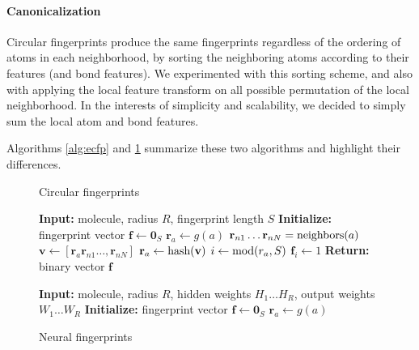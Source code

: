 \documentclass{article}
\newcommand{\vv}{\mathbf{v}}
\newcommand{\vf}{\mathbf{f}}
\newcommand{\vr}{\mathbf{r}}
\newcommand{\vzero}{\mathbf{0}}
\begin{document}
\paragraph{Canonicalization}
Circular fingerprints produce the same fingerprints regardless of the ordering of atoms in each neighborhood, by sorting the neighboring atoms according to their features (and bond features).
We experimented with this sorting scheme, and also with applying the local feature transform on all possible permutation of the local neighborhood.
In the interests of simplicity and scalability, we decided to simply sum the local atom and bond features.

Algorithms \ref{alg:ecfp} and \ref{alg:neural} summarize these two algorithms and highlight their differences.

\begin{figure}[t]
 \begin{minipage}[t]{0.49\columnwidth}
 \begin{algorithm}[H]
\caption{Circular fingerprints} 
\label{alg:ecfp} 
\begin{algorithmic}[1]
\State \textbf{Input:} {molecule, radius $R$, fingerprint length $S$}
\State \textbf{Initialize:} {fingerprint vector $\vf \leftarrow \vzero_S$}
    \State $\vr_a \leftarrow g(a)$ 
\EndFor
{} 
		\State $\vr_{n1} \dots \vr_{nN} = \textnormal{neighbors}(a)$
		\State $\vv \leftarrow [\vr_a \vr_{n1} \dots, \vr_{nN}]$ 
		\State $\vr_a \leftarrow \textnormal{hash}(\vv)$ 
		\State $i \leftarrow \textnormal{mod}(r_a, S)$ 		
		\State $\vf_{i} \leftarrow 1$ 
	\EndFor
\EndFor
\State \textbf{Return:} {binary vector $\vf$}
\end{algorithmic}
\end{algorithm}
\end{minipage}
\hfill
\begin{minipage}[t]{0.49\columnwidth}
\begin{algorithm}[H]
\caption{Neural fingerprints} 
\label{alg:neural} 
\begin{algorithmic}[1]
\State \textbf{Input:} {molecule, radius $R$, {\color{myfavblue} hidden weights $H_1 \dots H_R$, output weights $W_1 \dots W_R$}}
\State \textbf{Initialize:} {fingerprint vector $\vf \leftarrow \vzero_S$}
	\State $\vr_a \leftarrow g(a)$ 

\end{algorithmic}
\end{algorithm}
\end{minipage}
\end{figure}
\end{document}
